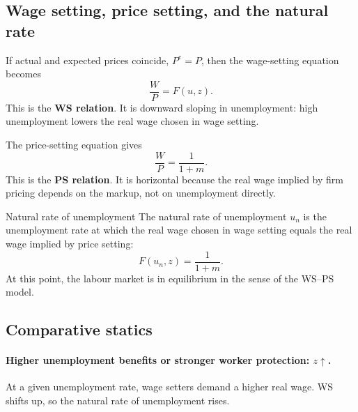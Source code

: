 \documentclass[12pt]{article}
\begin{document}
\subsection{Wage setting, price setting, and the natural rate}

If actual and expected prices coincide, $P^e=P$, then the wage-setting equation becomes
\[
\frac{W}{P}=F(u,z).
\]
This is the \textbf{WS relation}. It is downward sloping in unemployment: high unemployment lowers the real wage chosen in wage setting.

The price-setting equation gives
\[
\frac{W}{P}=\frac{1}{1+m}.
\]
This is the \textbf{PS relation}. It is horizontal because the real wage implied by firm pricing depends on the markup, not on unemployment directly.

\begin{center}
\end{center}

\begin{theorem}{Natural rate of unemployment}{}
The natural rate of unemployment $u_n$ is the unemployment rate at which the real wage chosen in wage setting equals the real wage implied by price setting:
\[
F(u_n,z)=\frac{1}{1+m}.
\]
At this point, the labour market is in equilibrium in the sense of the WS--PS model.
\end{theorem}


\newpage
\subsection{Comparative statics}

\paragraph{Higher unemployment benefits or stronger worker protection: $z \uparrow$.}
At a given unemployment rate, wage setters demand a higher real wage. WS shifts up, so the natural rate of unemployment rises.
\end{document}
